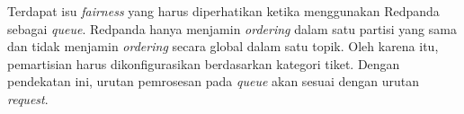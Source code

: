 Terdapat isu \textit{fairness} yang harus diperhatikan ketika menggunakan Redpanda sebagai \textit{queue}. Redpanda hanya menjamin \textit{ordering} dalam satu partisi yang sama dan tidak menjamin \textit{ordering} secara global dalam satu topik. Oleh karena itu, pemartisian harus dikonfigurasikan berdasarkan kategori tiket. Dengan pendekatan ini, urutan pemrosesan pada \textit{queue} akan sesuai dengan urutan \textit{request}.
